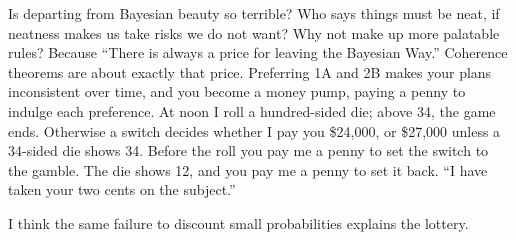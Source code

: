 Is departing from Bayesian beauty so terrible? Who says things must be neat, if neatness makes us take risks we do not want? Why not make up more palatable rules? Because ``There is always a price for leaving the Bayesian Way.'' Coherence theorems are about exactly that price. Preferring 1A and 2B makes your plans inconsistent over time, and you become a money pump, paying a penny to indulge each preference. At noon I roll a hundred-sided die; above 34, the game ends. Otherwise a switch decides whether I pay you \$24,000, or \$27,000 unless a 34-sided die shows 34. Before the roll you pay me a penny to set the switch to the gamble. The die shows 12, and you pay me a penny to set it back. ``I have taken your two cents on the subject.'' 

I think the same failure to discount small probabilities explains the lottery. 
